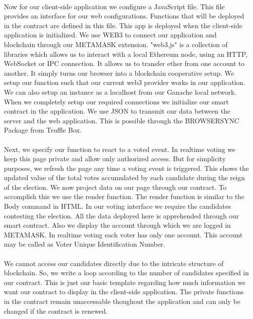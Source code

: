 \documentclass{report}
\begin{document}
\\
Now for our client-side application we configure a JavaScript file. This file provides an interface for our web configurations. Functions that will be deployed in the contract are defined in this file. This app is deployed when the client-side application is initialized. We use WEB3 to connect our application and blockchain through our METAMASK extension. "web3.js" is a collection of libraries which allows us to interact with a local Ethereum node, using an HTTP, WebSocket or IPC connection. It allows us to transfer ether from one account to another. It simply turns our browser into a blockchain cooperative setup. We setup our function such that our current web3 provider works in our application. We can also setup an instance as a localhost from our Ganache local network.  When we completely setup our required connections we initialize our smart contract in the application. We use JSON to transmit our data between the server and the web application. This is possible through the BROWSERSYNC Package from Truffle Box.
\\

\\
Next, we specify our function to react to a voted event. In realtime voting we keep this page private and allow only authorized access. But for simplicity purposes, we refresh the page any time a voting event is triggered. This shows the updated value of the total votes accumulated by each candidate during the reign of the election. We now project data on our page through our contract. To accomplish this we use the render function.  The render function is similar to the Body command in HTML. In our voting interface we require the candidates contesting the election. All the data deployed here is apprehended through our smart contract. Also we display the account through which we are logged in METAMASK. In realtime voting each voter has only one account. This account may be called as Voter Unique Identification Number.
\\

\\
We cannot access our candidates directly due to the intricate structure of blockchain. So, we write a loop according to the number of candidates specified in our contract. This is just our basic template regarding how much information we want our contract to display in the client-side application. The private functions in the contract remain unaccessable thoughout the application and can only be changed if the contract is renewed. 
\\
\end{document}
